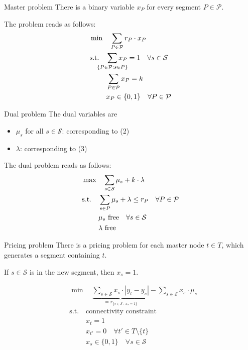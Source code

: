 \documentclass[fleqn]{beamer}
\newcommand{\superpixels}{\mathcal{S}}
\newcommand{\segments}{\mathcal{P}}
\begin{document}
	\begin{frame}{Master problem}
		There is a binary variable $x_P$ for every segment $P\in\segments$.
        
		The problem reads as follows:
		\begin{align}
    		&\min\quad \sum_{P\in\mathcal{P}} r_P\cdot x_P\\
		    &\text{s.t.}\quad \smashoperator{\sum_{\{P\in\mathcal{P}:s\in P\}}} x_P = 1 \quad\forall s\in\superpixels \\
		    &\phantom{\text{s.t.}\quad} \sum_{P\in\mathcal{P}} x_P = k \\
		    &\phantom{\text{s.t.}\quad} x_P \in \{0,1\} \quad\forall P\in\segments
		\end{align}
	\end{frame}
	
	\begin{frame}{Dual problem}
		The dual variables are
		\begin{itemize}
			\item $\mu_s$ for all $s\in\superpixels$: corresponding to (2)
			\item $\lambda$: corresponding to (3)
		\end{itemize}
		
		The dual problem reads as follows:
		\begin{align}
		    &\max\quad \smashoperator{\sum_{s\in\superpixels}} \mu_s + k\cdot\lambda \\
		    &\text{s.t.}\quad \sum_{s\in P} \mu_s + \lambda \leq r_P \quad\forall P\in\mathcal{P} \\
		    &\phantom{\text{s.t.}\quad} \mu_s \text{ free} \quad\forall s\in\superpixels \\
		    &\phantom{\text{s.t.}\quad} \lambda \text{ free}
		\end{align}
	\end{frame}
	
	\begin{frame}{Pricing problem}
		There is a pricing problem for each master node $t\in T$,
		which generates a segment containing $t$.
		
		If $s\in\superpixels$ is in the new segment, then $x_s=1$.		
		 
		\begin{align}
    		&\min\quad \underbrace{\sum_{s\in\superpixels} x_s\cdot|y_t-y_s|}_{=r_{\{s\in\superpixels\ :\ x_s=1\}}} - \sum_{s\in\superpixels} x_s\cdot\mu_s \\
    		&\text{s.t.}\quad \text{connectivity constraint} \\
            &\phantom{\text{s.t.}\quad} x_t = 1 \\
            &\phantom{\text{s.t.}\quad} x_{t'} = 0 \quad\forall t'\in T\setminus\{t\} \\
	    	&\phantom{\text{s.t.}\quad} x_s \in\{0,1\} \quad\forall s\in\superpixels
		\end{align}
	\end{frame}
	
\end{document}
